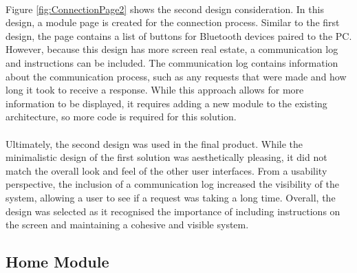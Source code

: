 {		\paragraph{}{
		Figure \ref{fig:ConnectionPage2} shows the second design consideration. In this design, a module page is created for the connection process. Similar to the first design, the page contains a list of buttons for Bluetooth devices paired to the PC. However, because this design has more screen real estate, a communication log and instructions can be included. The communication log contains information about the communication process, such as any requests that were made and how long it took to receive a response. While this approach allows for more information to be displayed, it requires adding a new module to the existing architecture, so more code is required for this solution.
		}
		
		\paragraph{}{
		Ultimately, the second design was used in the final product. While the minimalistic design of the first solution was aesthetically pleasing, it did not match the overall look and feel of the other user interfaces. From a usability perspective, the inclusion of a communication log increased the visibility of the system, allowing a user to see if a request was taking a long time. Overall, the design was selected as it recognised the importance of including instructions on the screen and maintaining a cohesive and visible system.
		}
	}
	\label{ssec:DesignConnectionModule}
	\subsection{Home Module}
		\paragraph{}{
		
		}
